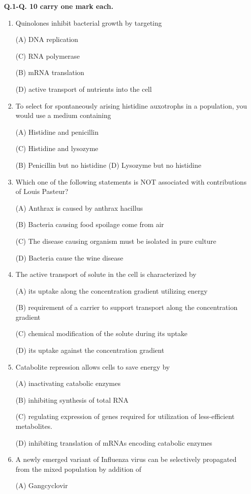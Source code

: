 \documentclass[journal]{IEEEtran}
\begin{document}
\textbf{Q.1-Q. 10 carry one mark each.}
\begin{enumerate}
\item {Quinolones inhibit bacterial growth by targeting

(A) DNA replication

(C) RNA polymerase

(B) mRNA translation

(D) active transport of nutrients into the cell
}
\item {To select for spontaneously arising histidine auxotrophs in a population, you would use a medium containing

(A) Histidine and penicillin

(C) Histidine and lysozyme

(B) Penicillin but no histidine
(D) Lysozyme but no histidine
}
\item {Which one of the following statements is NOT associated with contributions of Louis Pasteur?

(A) Anthrax is caused by anthrax hacillus


(B) Bacteria causing food spoilage come from air

(C) The disease causing organism must be isolated in pure culture

(D) Bacteria cause the wine disease
}
\item {The active transport of solute in the cell is characterized by

(A) its uptake along the concentration gradient utilizing energy

(B) requirement of a carrier to support transport along the concentration gradient

(C) chemical modification of the solute during its uptake

(D) its uptake against the concentration gradient
}
\item {Catabolite repression allows cells to save energy by

(A) inactivating catabolic enzymes

(B) inhibiting synthesis of total RNA

(C) regulating expression of genes required for utilization of less-efficient metabolites.

(D) inhibiting translation of mRNAs encoding catabolic enzymes
}
\item {A newly emerged variant of Influenza virus can be selectively propagated from the mixed population by addition of

(A) Gangcyclovir

}
\end{enumerate}
\end{document}
